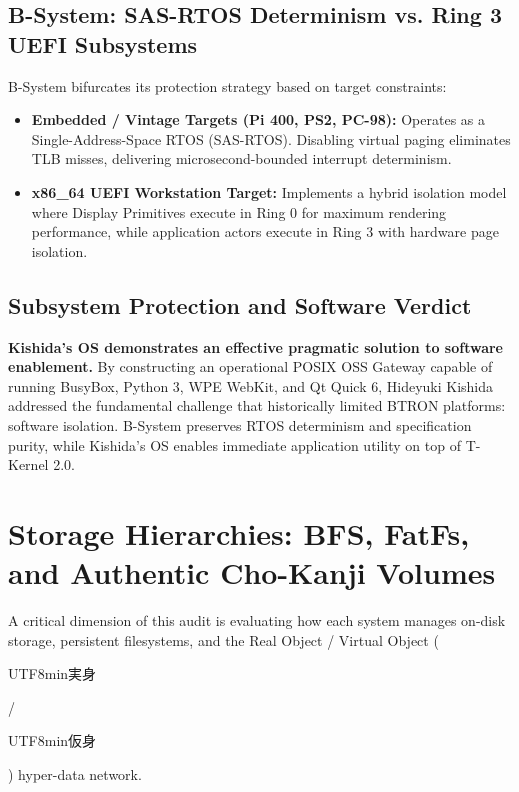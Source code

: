 \documentclass[10pt,journal,compsoc,twocolumn]{article}
\newcommand{\ja}[1]{\begin{CJK*}{UTF8}{min}#1\end{CJK*}}
\begin{document}
\subsection{B-System: SAS-RTOS Determinism vs. Ring 3 UEFI Subsystems}
B-System bifurcates its protection strategy based on target constraints:
\begin{itemize}[leftmargin=*]
    \item \textbf{Embedded / Vintage Targets (Pi 400, PS2, PC-98):} Operates as a Single-Address-Space RTOS (SAS-RTOS). Disabling virtual paging eliminates TLB misses, delivering microsecond-bounded interrupt determinism.
    \item \textbf{x86\_64 UEFI Workstation Target:} Implements a hybrid isolation model where Display Primitives execute in Ring 0 for maximum rendering performance, while application actors execute in Ring 3 with hardware page isolation.
\end{itemize}

\subsection{Subsystem Protection and Software Verdict}
\textbf{Kishida's OS demonstrates an effective pragmatic solution to software enablement.} By constructing an operational POSIX OSS Gateway capable of running BusyBox, Python 3, WPE WebKit, and Qt Quick 6, Hideyuki Kishida addressed the fundamental challenge that historically limited BTRON platforms: software isolation. B-System preserves RTOS determinism and specification purity, while Kishida's OS enables immediate application utility on top of T-Kernel 2.0.

\section{Storage Hierarchies: BFS, FatFs, and Authentic Cho-Kanji Volumes}
\label{sec:fs}

A critical dimension of this audit is evaluating how each system manages on-disk storage, persistent filesystems, and the Real Object / Virtual Object (\ja{実身}/\ja{仮身}) hyper-data network.
\end{document}
